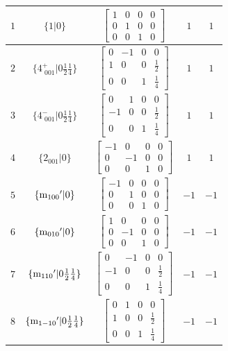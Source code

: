 \documentclass[fleqn,8pt]{jsarticle}
\begin{document}
\begin{longtable}{ccccc}
$ 1 $ & $ \{1|0\} $ & $ \begin{bmatrix} 1 & 0 & 0 & 0 \\ 0 & 1 & 0 & 0 \\ 0 & 0 & 1 & 0 \end{bmatrix} $ & $ 1 $ & $ 1 $ \\ \hline
$ 2 $ & $ \{4^{+}_{\,\,001}|0 \frac{1}{2} \frac{1}{4}\} $ & $ \begin{bmatrix} 0 & -1 & 0 & 0 \\ 1 & 0 & 0 & \frac{1}{2} \\ 0 & 0 & 1 & \frac{1}{4} \end{bmatrix} $ & $ 1 $ & $ 1 $ \\ \hline
$ 3 $ & $ \{4^{-}_{\,\,001}|0 \frac{1}{2} \frac{1}{4}\} $ & $ \begin{bmatrix} 0 & 1 & 0 & 0 \\ -1 & 0 & 0 & \frac{1}{2} \\ 0 & 0 & 1 & \frac{1}{4} \end{bmatrix} $ & $ 1 $ & $ 1 $ \\ \hline
$ 4 $ & $ \{2{}_{001}|0\} $ & $ \begin{bmatrix} -1 & 0 & 0 & 0 \\ 0 & -1 & 0 & 0 \\ 0 & 0 & 1 & 0 \end{bmatrix} $ & $ 1 $ & $ 1 $ \\ \hline
$ 5 $ & $ \{{\rm m}_{100}{}'|0\} $ & $ \begin{bmatrix} -1 & 0 & 0 & 0 \\ 0 & 1 & 0 & 0 \\ 0 & 0 & 1 & 0 \end{bmatrix} $ & $ -1 $ & $ -1 $ \\ \hline
$ 6 $ & $ \{{\rm m}_{010}{}'|0\} $ & $ \begin{bmatrix} 1 & 0 & 0 & 0 \\ 0 & -1 & 0 & 0 \\ 0 & 0 & 1 & 0 \end{bmatrix} $ & $ -1 $ & $ -1 $ \\ \hline
$ 7 $ & $ \{{\rm m}_{110}{}'|0 \frac{1}{2} \frac{1}{4}\} $ & $ \begin{bmatrix} 0 & -1 & 0 & 0 \\ -1 & 0 & 0 & \frac{1}{2} \\ 0 & 0 & 1 & \frac{1}{4} \end{bmatrix} $ & $ -1 $ & $ -1 $ \\ \hline
$ 8 $ & $ \{{\rm m}_{1-10}{}'|0 \frac{1}{2} \frac{1}{4}\} $ & $ \begin{bmatrix} 0 & 1 & 0 & 0 \\ 1 & 0 & 0 & \frac{1}{2} \\ 0 & 0 & 1 & \frac{1}{4} \end{bmatrix} $ & $ -1 $ & $ -1 $ \\ \hline

\end{longtable}
\end{document}
